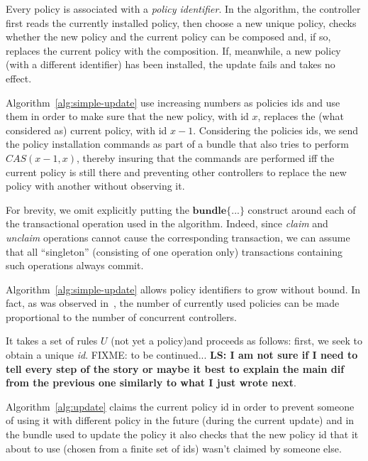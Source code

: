 \documentclass[conference]{sigcomm-alternate}
\newcommand{\hide}[1]{}
\begin{document}
Every policy is associated with a \emph{policy identifier}.
In the algorithm, the controller first reads the currently installed
policy, then choose a new unique policy, checks whether the new
policy and the current policy can be composed and, if so, replaces the
current policy with the composition. If, meanwhile, a new
policy (with a different identifier) has been installed, the update
fails and takes no effect.

Algorithm~\ref{alg:simple-update} use increasing numbers as policies
ids and use them in order to make sure that the new policy, with id
$x$, replaces the (what considered as) current policy, with id
$x-1$. Considering the policies ids, we send the policy installation
commands as part of a bundle that also tries to perform
$CAS(x-1,x)$, thereby insuring that the commands are
performed iff the current policy is still there and preventing other
controllers to replace the new policy with another without observing it.

For brevity, we omit explicitly putting the $\textbf{bundle}\{...\}$ construct
around each of the transactional operation used in the algorithm.
Indeed, since \textit{claim} and \textit{unclaim} operations cannot
cause the corresponding transaction, we can assume that all
``singleton'' (consisting of one operation only)  transactions
containing such operations always commit.

Algorithm~\ref{alg:simple-update} allows policy identifiers to grow
without bound. In fact, as was observed in~\cite{cpc}, the number of currently
used policies can be made proportional to the number of concurrent
controllers.


 It takes a set of rules $U$ (not yet a policy)and proceeds as follows: first, we seek to
 obtain a unique \emph{id}. FIXME: to be continued...
 \textbf{LS: I am not sure if I need to tell every step of the story or maybe it best to explain the main dif from the previous one similarly to what I just wrote next}.

Algorithm~\ref{alg:update} claims the current policy id in order to prevent someone of using it with different policy in the future (during the current update) and in the bundle used to update the policy it also checks that the new policy id that it about to use (chosen from a finite set of ids) wasn't claimed by someone else.

\hide{
We compute our new suggested policy by applying the update requests on top of current policy, supporting any kind of requests and policies. Then we make a transaction (using the bundle feature) to atomically check that our policy id is not blocked by anyone else, to change the current policy id to ours (an action that would fail if the current policy id is no longer what we are counting of) and to actually configure our new policy.

If one of the actions in the transaction fails we try again. There is no progress guaranty for each controller but there is one for the whole system - at least one of the controller will succeed in fulfilling its update requirements.
}
\end{document}
